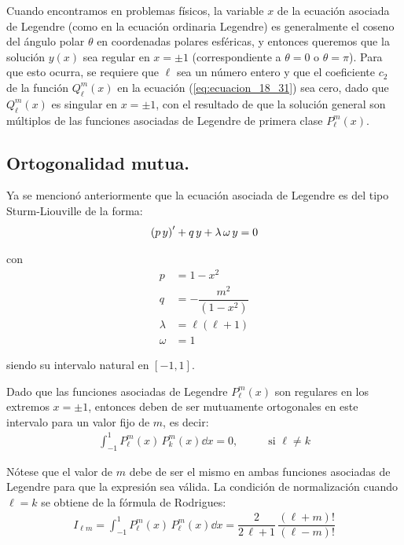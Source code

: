 Cuando encontramos en problemas físicos, la variable $x$ de la ecuación asociada de Legendre (como en la ecuación ordinaria Legendre) es generalmente el coseno del ángulo polar $\theta$ en coordenadas polares esféricas, y entonces queremos que la solución $y (x)$ sea regular en $x = \pm 1$ (correspondiente a $\theta = 0$ o $\theta = \pi$). Para que esto ocurra, se requiere que $\ell$ sea un número entero y que el coeficiente $c_{2}$ de la función $Q_{\ell}^{m} (x)$ en la ecuación (\ref{eq:ecuacion_18_31}) sea cero, dado que $Q_{\ell}^{m}(x)$ es singular en $x = \pm 1$, con el resultado de que la solución general son múltiplos de las funciones asociadas de Legendre de primera clase $P_{\ell}^{m}(x)$.

\subsection{Ortogonalidad mutua.}

Ya se mencionó anteriormente que la ecuación asociada de Legendre es del tipo Sturm-Liouville de la forma:
\begin{align*}
{(p \, y)}^{\prime} + q \, y + \lambda \,  \omega \, y = 0
\end{align*}

con
\begin{align*}
p &= 1 - x^{2} \\[0.5em]
q &= - \dfrac{m^{2}}{(1 - x^{2})} \\[0.5em]
\lambda &= \ell (\ell + 1) \\[0.5em]
\omega &= 1
\end{align*}

siendo su intervalo natural en $[-1,1]$.
\par
Dado que las funciones asociadas de Legendre $P_{\ell}^{m} (x)$ son regulares en los extremos $x = \pm 1$, entonces deben de ser mutuamente ortogonales en este intervalo para un valor fijo de $m$, es decir:
\begin{align}
\int_{-1}^{1} P_{\ell}^{m} (x) \, P_{k}^{m} (x) \dd{x}  = 0, \hspace{1cm} \mbox{ si } \ell \neq	 k
\label{eq:ecuacion_18_36}
\end{align}

Nótese que el valor de $m$ debe de ser el mismo en ambas funciones asociadas de Legendre para que la expresión sea válida. La condición de normalización cuando $\ell = k$ se obtiene de la fórmula de Rodrigues:
\begin{align}
I_{\ell m} = \int_{-1}^{1} P_{\ell}^{m} (x) \, P_{\ell}^{m} (x) \dd{x} = \dfrac{2}{2 \, \ell + 1} \, \dfrac{(\ell + m)!}{( \ell - m)!}
\label{eq:ecuacion_18_37}
\end{align}

